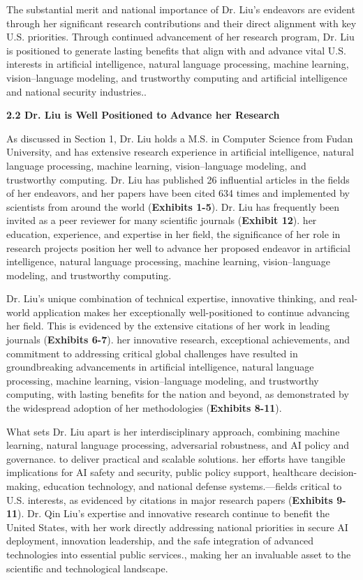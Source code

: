 \documentclass{article}
\begin{document}
The substantial merit and national importance of Dr. Liu's endeavors are evident through her significant research contributions and their direct alignment with key U.S. priorities. Through continued advancement of her research program, Dr. Liu is positioned to generate lasting benefits that align with and advance vital U.S. interests in artificial intelligence, natural language processing, machine learning, vision–language modeling, and trustworthy computing and artificial intelligence and national security industries..



{\bf 2.2 Dr. Liu is Well Positioned to Advance her Research}

As discussed in Section 1, Dr. Liu holds a M.S. in Computer Science from Fudan University, and has extensive research experience in artificial intelligence, natural language processing, machine learning, vision–language modeling, and trustworthy computing. Dr. Liu has published 26 influential articles in the fields of her endeavors, and her papers have been cited 634 times and implemented by scientists from around the world (\textbf{Exhibits 1-5}). Dr. Liu has frequently been invited as a peer reviewer for many scientific journals (\textbf{Exhibit 12}). her education, experience, and expertise in her field, the significance of her role in research projects position her well to advance her proposed endeavor in artificial intelligence, natural language processing, machine learning, vision–language modeling, and trustworthy computing.

Dr. Liu's unique combination of technical expertise, innovative thinking, and real-world application makes her exceptionally well-positioned to continue advancing her field. This is evidenced by the extensive citations of her work in leading journals (\textbf{Exhibits 6-7}). her innovative research, exceptional achievements, and commitment to addressing critical global challenges have resulted in groundbreaking advancements in artificial intelligence, natural language processing, machine learning, vision–language modeling, and trustworthy computing, with lasting benefits for the nation and beyond, as demonstrated by the widespread adoption of her methodologies (\textbf{Exhibits 8-11}).

What sets Dr. Liu apart is her interdisciplinary approach, combining machine learning, natural language processing, adversarial robustness, and AI policy and governance. to deliver practical and scalable solutions. her efforts have tangible implications for AI safety and security, public policy support, healthcare decision-making, education technology, and national defense systems.—fields critical to U.S. interests, as evidenced by citations in major research papers (\textbf{Exhibits 9-11}). Dr. Qin Liu's expertise and innovative research continue to benefit the United States, with her work directly addressing national priorities in secure AI deployment, innovation leadership, and the safe integration of advanced technologies into essential public services., making her an invaluable asset to the scientific and technological landscape.
\end{document}
